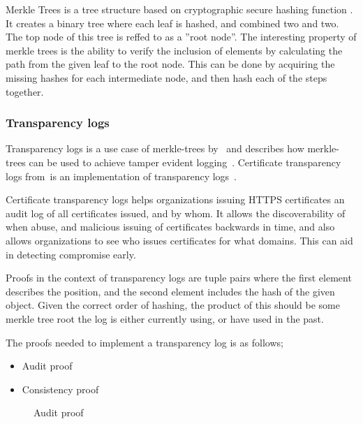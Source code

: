 \documentclass[../Main/thesis.tex]{subfiles}
\begin{document}
Merkle Trees is a tree structure based on cryptographic secure hashing function
\cite{ralph-c.-merkle-1998}. It creates a binary tree where each leaf is hashed,
and combined two and two. The top node of this tree is reffed to as a ''root
node''. The interesting property of merkle trees is the ability to verify the
inclusion of elements by calculating the path from the given leaf to the root
node. This can be done by acquiring the missing hashes for each intermediate
node, and then hash each of the steps together.

\subsubsection{Transparency logs}%
\label{sub:certificate_transparency_log}
Transparency logs is a use case of merkle-trees by~\citeauthor{182788} and
describes how merkle-trees can be used to achieve tamper evident
logging~\cite{182788}. Certificate transparency logs
from~\citeauthor{b.-laurie-a.-langley-e.kaster-google-2013}is an implementation
of transparency logs~\cite{b.-laurie-a.-langley-e.kaster-google-2013}.

Certificate transparency logs helps organizations issuing HTTPS certificates an
audit log of all certificates issued, and by whom. It allows the discoverability
of when abuse, and malicious issuing of certificates backwards in time, and also
allows organizations to see who issues certificates for what domains. This can
aid in detecting compromise early.

Proofs in the context of transparency logs are tuple pairs where the first
element describes the position, and the second element includes the hash of
the given object. Given the correct order of hashing, the product of this
should be some merkle tree root the log is either currently using, or have
used in the past.

The proofs needed to implement a transparency log is as follows;
\begin{itemize}
\item Audit proof
\item Consistency proof
\end{itemize}

\begin{figure}[H]
\centering
{}%
\qquad
{}%
\caption{Audit proof}
\label{fig:audit}
\end{figure}
\end{document}
